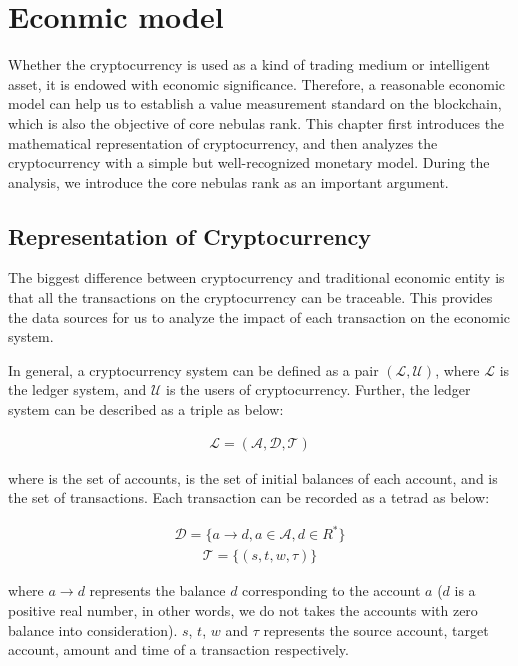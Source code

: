 \section{Econmic model}
Whether the cryptocurrency is used as a kind of trading medium or intelligent asset, it is endowed with economic significance. Therefore, a reasonable economic model can help us to establish a value measurement standard on the blockchain, which is also the objective of core nebulas rank. This chapter first introduces the mathematical representation of cryptocurrency, and then analyzes the cryptocurrency with a simple but well-recognized monetary model. During the analysis, we introduce the core nebulas rank as an important argument.

\subsection{Representation of Cryptocurrency}
The biggest difference between cryptocurrency and traditional economic entity is that all the transactions on the cryptocurrency can be traceable. This provides the data sources for us to analyze the impact of each transaction on the economic system.

In general, a cryptocurrency system can be defined as a pair $(\mathcal{L}, \mathcal{U})$, where $\mathcal{L}$ is the ledger system, and $\mathcal{U}$ is the users of cryptocurrency. Further, the ledger system can be described as a triple as below:

\begin{align}
\mathcal{L} = (\mathcal{A}, \mathcal{D}, \mathcal{T})
\end{align}

\noindent where  is the set of accounts,  is the set of initial balances of each account, and  is the set of transactions. Each transaction can be recorded as a tetrad as below:

\begin{align}
\mathcal{D} = \{a \rightarrow d, a{\in}\mathcal{A}, d{\in}R^*\}
\end{align}
\begin{align}
\mathcal{T} = \{(s, t, w, \tau)\}
\end{align}

\noindent where $a \rightarrow d$ represents the balance $d$ corresponding to the account $a$ ($d$ is a positive real number, in other words, we do not takes the accounts with zero balance into consideration). $s$, $t$, $w$ and $\tau$ represents the source account, target account, amount and time of a transaction respectively.

